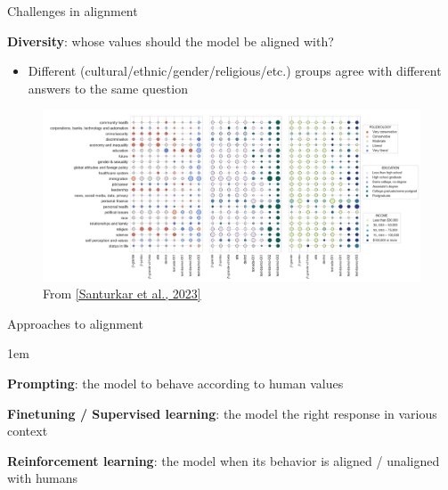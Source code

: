 \documentclass[usenames,dvipsnames,notes,11pt,aspectratio=169,hyperref={colorlinks=true, linkcolor=blue}]{beamer}
\begin{document}
\begin{frame}
    {Challenges in alignment}
    
    \textbf{Diversity}: whose values should the model be aligned with?\\
    \begin{itemize}
        \item Different (cultural/ethnic/gender/religious/etc.) groups agree with different answers to the same question
    \end{itemize}
    \vspace{-1em}

    \begin{figure}
        \includegraphics[height=0.6\textheight]{figures/opinionqa}
        \caption{From \href{https://arxiv.org/pdf/2303.17548.pdf}{[Santurkar et al., 2023]}}
    \end{figure}
\end{frame}

\begin{frame}
    {Approaches to alignment}
    \begin{itemize}
        \itemsep1em
        \item \textbf{Prompting}:  the model to behave according to human values
            \textcolor<2->{fg!20}{
        \item \textbf{Finetuning / Supervised learning}:  the model the right response in various context
        \item \textbf{Reinforcement learning}:  the model when its behavior is aligned / unaligned with humans 
        }
    \end{itemize}
\end{frame}
\end{document}
